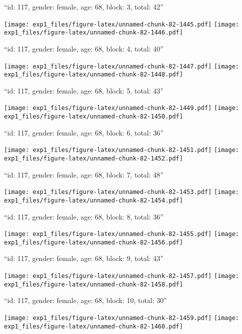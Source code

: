 \documentclass[11pt,,]{article}
\begin{document}
\newpage
[1] 

``id: 117, gender: female, age: 68, block: 3, total: 42''

\texttt{[image: exp1\_files/figure-latex/unnamed-chunk-82-1445.pdf]}
\texttt{[image: exp1\_files/figure-latex/unnamed-chunk-82-1446.pdf]}

\newpage
[1] 

``id: 117, gender: female, age: 68, block: 4, total: 40''

\texttt{[image: exp1\_files/figure-latex/unnamed-chunk-82-1447.pdf]}
\texttt{[image: exp1\_files/figure-latex/unnamed-chunk-82-1448.pdf]}

\newpage
[1] 

``id: 117, gender: female, age: 68, block: 5, total: 43''

\texttt{[image: exp1\_files/figure-latex/unnamed-chunk-82-1449.pdf]}
\texttt{[image: exp1\_files/figure-latex/unnamed-chunk-82-1450.pdf]}

\newpage
[1] 

``id: 117, gender: female, age: 68, block: 6, total: 36''

\texttt{[image: exp1\_files/figure-latex/unnamed-chunk-82-1451.pdf]}
\texttt{[image: exp1\_files/figure-latex/unnamed-chunk-82-1452.pdf]}

\newpage
[1] 

``id: 117, gender: female, age: 68, block: 7, total: 48''

\texttt{[image: exp1\_files/figure-latex/unnamed-chunk-82-1453.pdf]}
\texttt{[image: exp1\_files/figure-latex/unnamed-chunk-82-1454.pdf]}

\newpage
[1] 

``id: 117, gender: female, age: 68, block: 8, total: 36''

\texttt{[image: exp1\_files/figure-latex/unnamed-chunk-82-1455.pdf]}
\texttt{[image: exp1\_files/figure-latex/unnamed-chunk-82-1456.pdf]}

\newpage
[1] 

``id: 117, gender: female, age: 68, block: 9, total: 43''

\texttt{[image: exp1\_files/figure-latex/unnamed-chunk-82-1457.pdf]}
\texttt{[image: exp1\_files/figure-latex/unnamed-chunk-82-1458.pdf]}

\newpage
[1] 

``id: 117, gender: female, age: 68, block: 10, total: 30''

\texttt{[image: exp1\_files/figure-latex/unnamed-chunk-82-1459.pdf]}
\texttt{[image: exp1\_files/figure-latex/unnamed-chunk-82-1460.pdf]}
\end{document}
